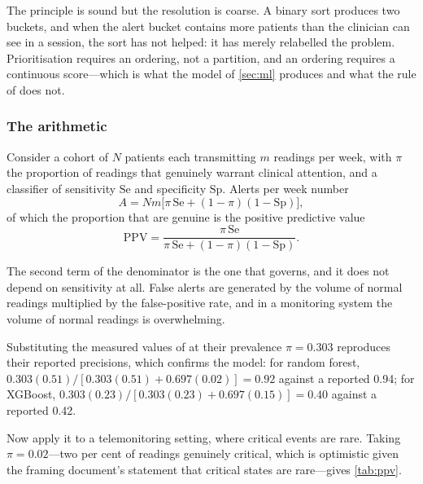 \documentclass[12pt,a4paper,oneside]{report}
\begin{document}
The principle is sound but the resolution is coarse. A binary sort produces two buckets, and when the alert bucket contains more patients than the clinician can see in a session, the sort has not helped: it has merely relabelled the problem. Prioritisation requires an ordering, not a partition, and an ordering requires a continuous score---which is what the model of \cref{sec:ml} produces and what the rule of \textcite{mihevc2025} does not.

\subsubsection{The arithmetic}\label{sec:volume-arithmetic}

Consider a cohort of $N$ patients each transmitting $m$ readings per week, with $\pi$ the proportion of readings that genuinely warrant clinical attention, and a classifier of sensitivity $\mathrm{Se}$ and specificity $\mathrm{Sp}$. Alerts per week number
\begin{equation}
  A = N m \bigl[\pi\,\mathrm{Se} + (1-\pi)(1-\mathrm{Sp})\bigr],
\end{equation}
of which the proportion that are genuine is the positive predictive value
\begin{equation}
  \mathrm{PPV} = \frac{\pi\,\mathrm{Se}}{\pi\,\mathrm{Se} + (1-\pi)(1-\mathrm{Sp})}.
\end{equation}

The second term of the denominator is the one that governs, and it does not depend on sensitivity at all. False alerts are generated by the volume of normal readings multiplied by the false-positive rate, and in a monitoring system the volume of normal readings is overwhelming.

Substituting the measured values of \textcite{mendoza2025} at their prevalence $\pi = 0.303$ reproduces their reported precisions, which confirms the model: for random forest, $0.303(0.51) / [0.303(0.51) + 0.697(0.02)] = 0.92$ against a reported 0.94; for XGBoost, $0.303(0.23)/[0.303(0.23) + 0.697(0.15)] = 0.40$ against a reported 0.42.

Now apply it to a telemonitoring setting, where critical events are rare. Taking $\pi = 0.02$---two per cent of readings genuinely critical, which is optimistic given the framing document's statement that critical states are rare---gives \cref{tab:ppv}.
\end{document}
